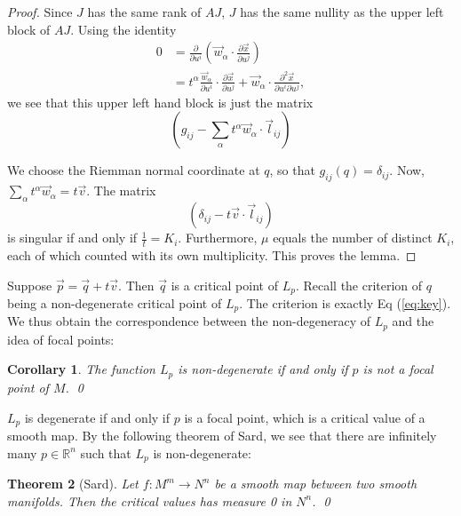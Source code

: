 \documentclass[12pt]{article}
\newtheorem{thm}{Theorem}[section]
\newtheorem{cor}[thm]{Corollary}
\newcommand{\RR}{\mathbb{R}}      %
\newcommand{\vect}[1]{\vec{#1}}
\begin{document}
\begin{proof}
  Since $J$ has the same rank of $AJ$, $J$ has the same nullity as the upper
  left block of $AJ$. Using the identity
  \begin{equation}
    \begin{aligned}
      0 &= \frac{\partial}{\partial u^i}\left(\vect{w}_{\alpha} \cdot
        \frac{\partial
          \vect{x}}{\partial u^j}\right) \\
      &= t^{\alpha}\frac{\vect{w}_{\alpha}}{\partial u^i} \cdot \frac{\partial
        \vect{x}}{\partial u^j} + \vect{w}_{\alpha} \cdot \frac{\partial^2
        \vect{x}}{\partial u^i \partial u^j},
    \end{aligned}
  \end{equation}
  we see that this upper left hand block is just the matrix 
  \begin{equation}
    \left( g_{ij} - \sum_{\alpha}t^{\alpha}\vect{w}_{\alpha} \cdot \vect{l}_{ij} \right)
  \end{equation}

  We choose the Riemman normal coordinate at $q$, so that $g_{ij}(q) =
  \delta_{ij}$. Now, $\sum_{\alpha}t^{\alpha}\vect{w}_{\alpha} = t\vect{v}$. The
  matrix
  \begin{equation}
    \label{eq:key}
    \left(
      \delta_{ij}-t\vect{v} \cdot  \vect{l}_{ij}
    \right)
  \end{equation}
  is singular if and only if $\frac{1}{t} = K_i$. Furthermore, $\mu$ equals the
  number of distinct $K_i$, each of which counted with its own
  multiplicity. This proves the lemma.
\end{proof}

Suppose $\vect{p} = \vect{q}+t\vect{v}$. Then $\vect{q}$ is a critical point of
$L_p$. Recall the criterion of $q$ being a non-degenerate critical point of
$L_p$. The criterion is exactly Eq (\ref{eq:key}). We thus obtain the
correspondence between the non-degeneracy of $L_p$ and the idea of focal points:

\begin{cor}
  The function $L_p$ is non-degenerate if and only if $p$ is not a focal point
  of $M$. \qed
\end{cor}

$L_p$ is degenerate if and only if $p$ is a focal point, which is a critical
value of a smooth map. By the following theorem of Sard, we see that there are
infinitely many $p \in \RR^n$ such that $L_p$ is non-degenerate:

\begin{thm}[Sard]
  Let $f: M^m \to N^n$ be a smooth map between two smooth manifolds. Then the
  critical values has measure 0 in $N^n$. \qed
\end{thm}
\end{document}
